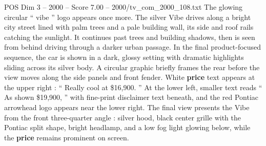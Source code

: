 \begin{textsample}{POS Dim 3 – 2000 – Score 7.00 – 2000/tv\_com\_2000\_108.txt}
The glowing circular “ vibe ” logo appears once more.
The silver Vibe drives along a bright city street lined with palm trees and a pale building wall, its side and roof rails catching the sunlight.
It continues past trees and building shadows, then is seen from behind driving through a darker urban passage.
In the final product-focused sequence, the car is shown in a dark, glossy setting with dramatic highlights sliding across its silver body.
A circular graphic briefly frames the rear before the view moves along the side panels and front fender.
White \textbf{price} text appears at the upper right : “ Really cool at \$16,900. ” At the lower left, smaller text reads “ As shown \$19,900, ” with fine-print disclaimer text beneath, and the red Pontiac arrowhead logo appears near the lower right.
The final view presents the Vibe from the front three-quarter angle : silver hood, black center grille with the Pontiac split shape, bright headlamp, and a low fog light glowing below, while the \textbf{price} remains prominent on screen.

\end{textsample}
